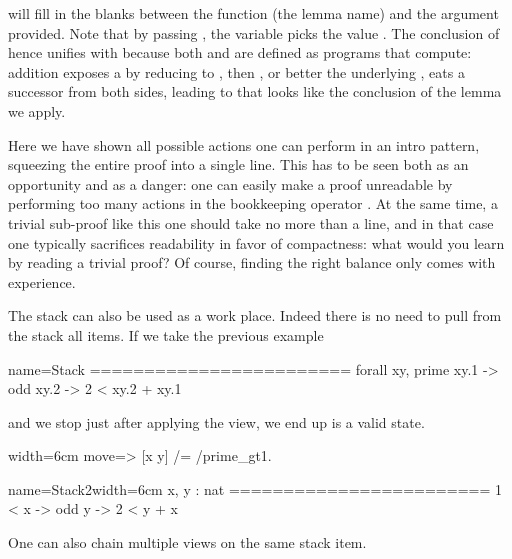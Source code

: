  will fill in the blanks between the function (the lemma name)
and the argument provided.  Note that by passing , the
variable  picks the value .  The conclusion of 
hence unifies with  because both \C{+} and \C{<} are
defined as programs that compute: addition exposes a  by
reducing to , then \C{<}, or better the underlying
\C{<=}, eats a successor from both sides, leading to 
that looks like the conclusion of the lemma we apply.

Here we have shown all possible actions one can perform in an intro
pattern, squeezing the entire proof into a single line.  This has
to be seen both as an opportunity and as a danger: one can easily
make a proof unreadable by performing too many actions in the bookkeeping
operator \C{=>}.  At the same time, a trivial sub-proof like this one
should take no more than a line, and in that case one typically
sacrifices readability in favor of compactness: what would you learn by
reading a trivial proof?  Of course,
finding the right balance only comes with experience.




The stack can also be used as a work place.  Indeed there is
no need to pull from the stack all items.  If we take the previous example

\begin{coqout}{name=Stack}{}
========================
forall xy, prime xy.1 -> odd xy.2 -> 2 < xy.2 + xy.1
\end{coqout}
and we stop just after applying the view, we end up is a valid state.

\begin{coq}{}{width=6cm}
move=> [x y] /= /prime_gt1.
\end{coq}
\begin{coqout}{name=Stack2}{width=6cm}
 x, y : nat
 ========================
 1 < x -> odd y -> 2 < y + x
\end{coqout}

One can also chain multiple views on the same stack item.


